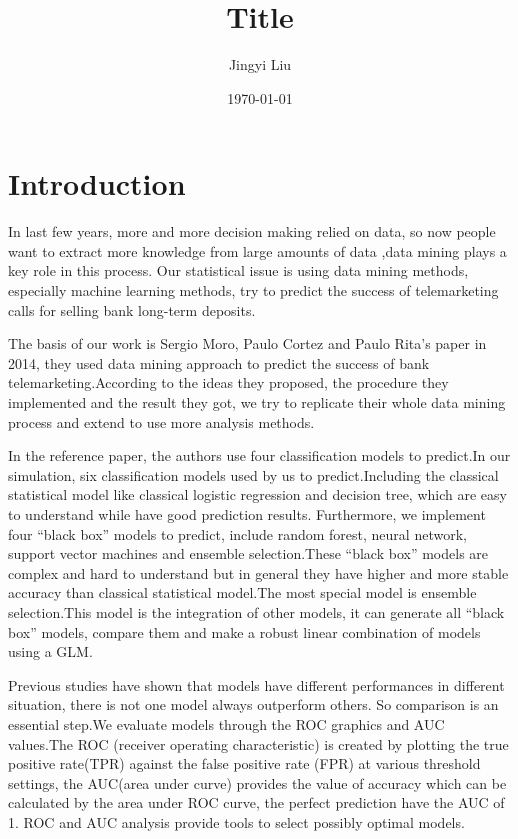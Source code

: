 \documentclass[12pt, a4paper, bibliography=totoc, english]{scrartcl}
\title{Title}
\author{Jingyi Liu}
\date{\today}
\begin{document}
	
	
	
	\clearpage
	
	\setcounter{page}{2}
	
	\tableofcontents
	
	\clearpage
	
	\listoffigures
	
	\clearpage
	
	\listoftables
	
	\clearpage
	
	\setcounter{page}{5}
	
	
	
	\section{Introduction}\label{Intro}
	In last few years, more and more decision making relied on data, so now people want to extract more knowledge from large amounts of data ,data mining plays a key role in this process. Our statistical issue is using data mining methods, especially machine learning methods, try to  predict the success of telemarketing calls for selling bank long-term deposits.
	
	The basis of our work is Sergio Moro, Paulo Cortez and Paulo Rita's paper in 2014, they used data mining approach to predict the success of bank telemarketing.According to the ideas they proposed, the procedure they implemented and the result they got, we try to replicate their whole data mining process and extend to use more analysis methods.
	
	
	In the reference paper, the authors use four classification models to predict.In our simulation,  six classification models used by us to predict.Including the classical statistical model like classical logistic regression and decision tree, which are easy to understand while have good prediction results. Furthermore, we implement four ``black box'' models to predict, include random forest, neural network, support vector machines and ensemble selection.These ``black box'' models are complex and hard to understand but in general they have higher and more stable accuracy than classical statistical model.The most special model is ensemble selection.This model is the integration of other models, it can generate all ``black box'' models, compare them and make a robust linear combination of models using a GLM. 
	
	Previous studies have shown that models have different performances in different situation, there is not one model always outperform others. So comparison is an essential step.We evaluate models through the ROC graphics and AUC values.The ROC (receiver operating characteristic) is created by plotting the true positive rate(TPR) against the false positive rate (FPR) at various threshold settings, the AUC(area under curve) provides the value of accuracy which can be calculated by the area under ROC curve, the perfect prediction have the AUC of 1. ROC  and AUC analysis provide tools to select possibly optimal models.
	
\end{document}

